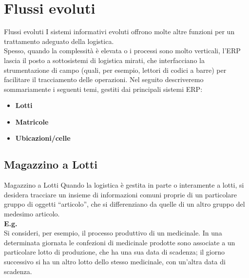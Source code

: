 \documentclass{beamer}
\begin{document}
\section{Flussi evoluti}
\begin{frame}{Flussi evoluti}
    I sistemi informativi evoluti offrono molte altre funzioni per un trattamento adeguato della logistica.\\
    Spesso, quando la complessità è elevata o i processi sono molto verticali, l'ERP lascia il posto a sottosistemi di logistica mirati, che interfacciano la strumentazione di campo (quali, per esempio, lettori di codici a barre) per facilitare il tracciamento delle operazioni. Nel seguito descriveremo sommariamente i seguenti temi, gestiti dai principali sistemi ERP:\\
    \begin{itemize}
        \item \textbf{Lotti}
        \item \textbf{Matricole}
        \item \textbf{Ubicazioni/celle}
    \end{itemize}
\end{frame}

\subsection{Magazzino a Lotti}
\begin{frame}{Magazzino a Lotti}
    Quando la logistica è gestita in parte o interamente a lotti, si desidera tracciare un insieme di informazioni comuni proprie di un particolare gruppo di oggetti “articolo”, che si differenziano da quelle di un altro gruppo del medesimo articolo.\\
    \vspace{1.5em}
    \textbf{E.g.}\\
    Si consideri, per esempio, il processo produttivo di un medicinale. In una determinata giornata le confezioni di medicinale prodotte sono associate a un particolare lotto di produzione, che ha una sua data di scadenza; il giorno successivo si ha un altro lotto dello stesso medicinale, con un'altra data di scadenza.
\end{frame}
\end{document}
